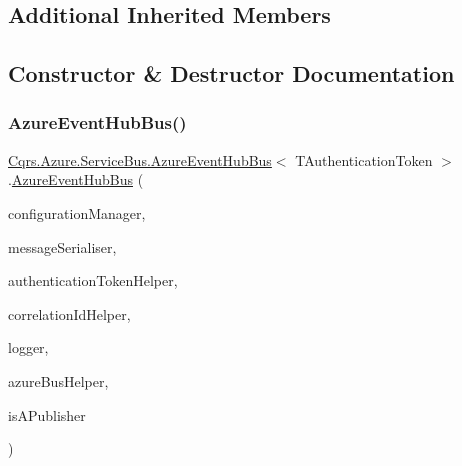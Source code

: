 \subsection*{Additional Inherited Members}


\subsection{Constructor \& Destructor Documentation}
\mbox{\label{classCqrs_1_1Azure_1_1ServiceBus_1_1AzureEventHubBus_aef24d23dd76d6bb0f58b582e2abf9872}} 
\subsubsection{\texorpdfstring{Azure\+Event\+Hub\+Bus()}{AzureEventHubBus()}}
{\footnotesize\ttfamily \hyperlink{classCqrs_1_1Azure_1_1ServiceBus_1_1AzureEventHubBus}{Cqrs.\+Azure.\+Service\+Bus.\+Azure\+Event\+Hub\+Bus}$<$ T\+Authentication\+Token $>$.\hyperlink{classCqrs_1_1Azure_1_1ServiceBus_1_1AzureEventHubBus}{Azure\+Event\+Hub\+Bus} (\begin{DoxyParamCaption}\item[{\hyperlink{interfaceCqrs_1_1Configuration_1_1IConfigurationManager}{I\+Configuration\+Manager}}]{configuration\+Manager,  }\item[{\hyperlink{interfaceCqrs_1_1Azure_1_1ServiceBus_1_1IMessageSerialiser}{I\+Message\+Serialiser}$<$ T\+Authentication\+Token $>$}]{message\+Serialiser,  }\item[{\hyperlink{interfaceCqrs_1_1Authentication_1_1IAuthenticationTokenHelper}{I\+Authentication\+Token\+Helper}$<$ T\+Authentication\+Token $>$}]{authentication\+Token\+Helper,  }\item[{I\+Correlation\+Id\+Helper}]{correlation\+Id\+Helper,  }\item[{I\+Logger}]{logger,  }\item[{\hyperlink{interfaceCqrs_1_1Azure_1_1ServiceBus_1_1IAzureBusHelper}{I\+Azure\+Bus\+Helper}$<$ T\+Authentication\+Token $>$}]{azure\+Bus\+Helper,  }\item[{bool}]{is\+A\+Publisher }\end{DoxyParamCaption})\hspace{0.3cm}{\ttfamily [protected]}}



